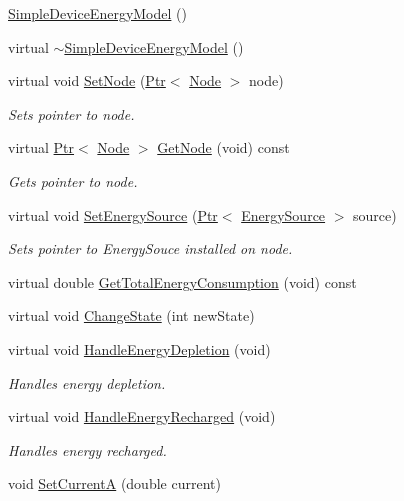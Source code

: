 \begin{DoxyCompactItemize}
\item 
\hyperlink{classns3_1_1SimpleDeviceEnergyModel_a86fe9781b68f97b9a186ce1dad7f6cfa}{Simple\+Device\+Energy\+Model} ()
\item 
virtual \hyperlink{classns3_1_1SimpleDeviceEnergyModel_a6a699b2ebd594571b5dd58136f334cf9}{$\sim$\+Simple\+Device\+Energy\+Model} ()
\item 
virtual void \hyperlink{classns3_1_1SimpleDeviceEnergyModel_ac454f993449a98ddd610296ac9866863}{Set\+Node} (\hyperlink{classns3_1_1Ptr}{Ptr}$<$ \hyperlink{classns3_1_1Node}{Node} $>$ node)
\begin{DoxyCompactList}\small\item\em Sets pointer to node. \end{DoxyCompactList}\item 
virtual \hyperlink{classns3_1_1Ptr}{Ptr}$<$ \hyperlink{classns3_1_1Node}{Node} $>$ \hyperlink{classns3_1_1SimpleDeviceEnergyModel_a38617c7d5e55f45c37d71e16c2873466}{Get\+Node} (void) const 
\begin{DoxyCompactList}\small\item\em Gets pointer to node. \end{DoxyCompactList}\item 
virtual void \hyperlink{classns3_1_1SimpleDeviceEnergyModel_adccfb18951ab328e076662a2cedd2340}{Set\+Energy\+Source} (\hyperlink{classns3_1_1Ptr}{Ptr}$<$ \hyperlink{classns3_1_1EnergySource}{Energy\+Source} $>$ source)
\begin{DoxyCompactList}\small\item\em Sets pointer to Energy\+Souce installed on node. \end{DoxyCompactList}\item 
virtual double \hyperlink{classns3_1_1SimpleDeviceEnergyModel_a366cfd8300aff1609389f92d2fe0e420}{Get\+Total\+Energy\+Consumption} (void) const 
\item 
virtual void \hyperlink{classns3_1_1SimpleDeviceEnergyModel_af3b60004cb2780123ae6245403e4c91b}{Change\+State} (int new\+State)
\item 
virtual void \hyperlink{classns3_1_1SimpleDeviceEnergyModel_aac1f14576de2a1b9c7082b4e085e4639}{Handle\+Energy\+Depletion} (void)
\begin{DoxyCompactList}\small\item\em Handles energy depletion. \end{DoxyCompactList}\item 
virtual void \hyperlink{classns3_1_1SimpleDeviceEnergyModel_a7f7688698b6da2afbb2a2ba945cff41d}{Handle\+Energy\+Recharged} (void)
\begin{DoxyCompactList}\small\item\em Handles energy recharged. \end{DoxyCompactList}\item 
void \hyperlink{classns3_1_1SimpleDeviceEnergyModel_a545d64c4f11c9ad2a4e37e48b27fb744}{Set\+CurrentA} (double current)
\end{DoxyCompactItemize}
